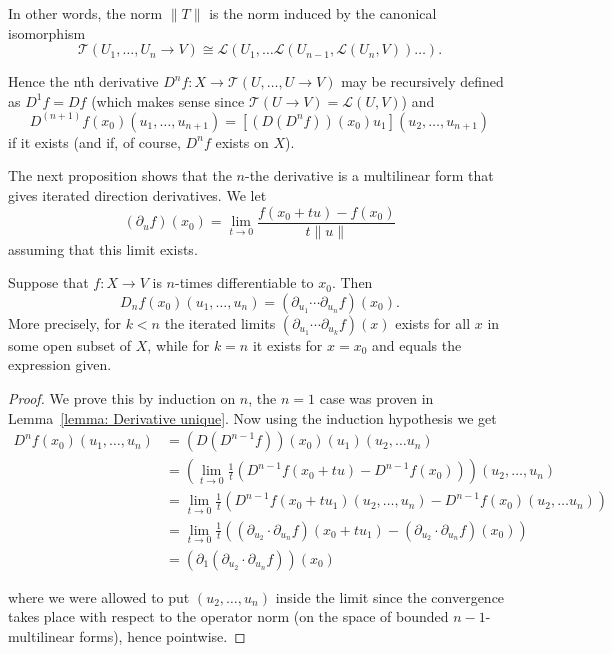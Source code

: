\documentclass[twoside, a4paper, 10pt]{amsart}
\begin{document}
In other words, the norm $\| T \|$ is the norm induced by the canonical isomorphism $$ \mathcal{T}(U_1, \ldots, U_n \to V) \cong  \mathcal{L}(U_1, \ldots \mathcal{L}(U_{n-1}, \mathcal{L}(U_n,V)) \ldots). $$

Hence the nth derivative $D^nf : X \to \mathcal{T}(U, \ldots, U \to V)$ may be recursively defined as $D^1f = Df$ (which makes sense since $\mathcal{T}(U \to V) = \mathcal{L}(U, V)$) and $$D^{(n+1)}f (x_0)(u_1, \ldots, u_{n+1}) = [(D(D^nf))(x_0)u_1] (u_2, \ldots, u_{n+1})$$ if it exists (and if, of course, $D^nf$ exists on $X$). 

The next proposition shows that the $n$-the derivative is a multilinear form that gives iterated direction derivatives. We let $$(\partial_{u}f)(x_0) = \lim_{t \to 0} \frac{f(x_0+tu) - f(x_0)}{t \|u \|} $$ assuming that this limit exists.

\begin{prop} Suppose that $f:X \to V$ is $n$-times differentiable to $x_0$. Then $$D_n f (x_0)(u_1, \ldots, u_n) = (\partial_{u_1} \cdots \partial_{u_n} f) (x_0).$$ More precisely, for $k<n$ the iterated limits $(\partial_{u_1} \cdots \partial_{u_k}f) (x)$ exists for all $x$ in some open subset of $X$, while for $k=n$ it exists for $x=x_0$ and equals the expression given.

\end{prop}

\begin{proof} We prove this by induction on $n$, the $n=1$ case was proven in Lemma~\ref{lemma: Derivative unique}. Now using the induction hypothesis we get
\begin{align*} 
D^nf(x_0)(u_1, \ldots, u_n) &= \left( D(D^{n-1}f) \right) (x_0)(u_1)(u_2, \ldots u_n) \\ 
&= \left( \lim_{t \to 0} \frac{1}{t} \left(D^{n-1}f(x_0+tu) - D^{n-1}f(x_0) \right) \right) (u_2, \ldots, u_n) \\
&= \lim_{t \to 0} \frac{1}{t} \left(D^{n-1}f(x_0+tu_1)(u_2, \ldots, u_n) - D^{n-1}f(x_0)(u_2, \ldots u_n) \right)\\
&=\lim_{t \to 0} \frac{1}{t} \left( (\partial_{u_2} \cdot \partial_{u_n}f)(x_0+tu_1) - (\partial_{u_2} \cdot \partial_{u_n}f)(x_0)  \right) \\
&= (\partial_1(\partial_{u_2} \cdot \partial_{u_n}f)) (x_0)
\end{align*}

where we were allowed to put $(u_2, \ldots, u_n)$ inside the limit since the convergence takes place with respect to the operator norm (on the space of bounded $n-1$-multilinear forms), hence pointwise. \end{proof}
\end{document}
